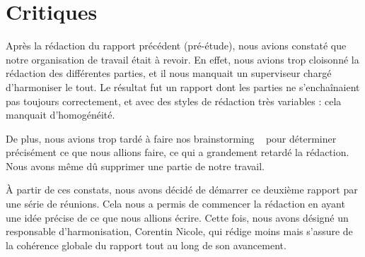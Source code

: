 \section{Critiques}
	Après la rédaction du rapport précédent (pré-étude), nous avions constaté que notre organisation de travail était à revoir. 
	En effet, nous avions trop cloisonné la rédaction des différentes parties, et il nous manquait un superviseur chargé d'harmoniser le tout.
	Le résultat fut un rapport dont les parties ne s'enchaînaient pas toujours correctement, et avec des styles de rédaction très variables : cela manquait d'homogénéité.

	De plus, nous avions trop tardé à faire nos \og brainstorming \fg~ pour déterminer précisément ce que nous allions faire, ce qui a grandement retardé la rédaction. Nous avons même dû supprimer une partie de notre travail.

	À partir de ces constats, nous avons décidé de démarrer ce deuxième rapport par une série de réunions. Cela nous a permis de commencer la rédaction en ayant une idée précise de ce que nous allions écrire.
	Cette fois, nous avons désigné un responsable d'harmonisation, Corentin Nicole, qui rédige moins mais s'assure de la cohérence globale du rapport tout au long de son avancement.

